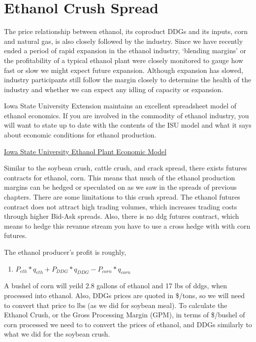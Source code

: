 \documentclass[
]{book}
\providecommand{\tightlist}{%
  \setlength{\itemsep}{0pt}\setlength{\parskip}{0pt}}
\begin{document}
\hypertarget{ethanol-crush-spread}{%
\section{Ethanol Crush Spread}\label{ethanol-crush-spread}}

The price relationship between ethanol, its coproduct DDGs and its inputs, corn and natural gas, is also closely followed by the industry. Since we have recently ended a period of rapid expansion in the ethanol industry, `blending margins' or the profitability of a typical ethanol plant were closely monitored to gauge how fast or slow we might expect future expansion. Although expansion has slowed, industry participants still follow the margin closely to determine the health of the industry and whether we can expect any idling of capacity or expansion.

Iowa State University Extension maintains an excellent spreadsheet model of ethanol economics. If you are involved in the commodity of ethanol industry, you will want to state up to date with the contents of the ISU model and what it says about economic conditions for ethanol production.

\href{https://www.extension.iastate.edu/agdm/articles/hof/HofJan08.html}{Iowa State University Ethanol Plant Economic Model}

Similar to the soybean crush, cattle crush, and crack spread, there exists futures contracts for ethanol, corn. This means that much of the ethanol production margins can be hedged or speculated on as we saw in the spreads of previous chapters. There are some limitations to this crush spread. The ethanol futures contract does not attract high trading volumes, which increases trading costs through higher Bid-Ask spreads. Also, there is no ddg futures contract, which means to hedge this revanue stream you have to use a cross hedge with with corn futures.

The ethanol producer's profit is roughly,

\begin{enumerate}
\def\labelenumi{\arabic{enumi}.}
\tightlist
\item
  \(P_{eth}*q_{eth} + P_{DDG}*q_{DDG} - P_{corn}*q_{corn}\)
\end{enumerate}

A bushel of corn will yeild 2.8 gallons of ethanol and 17 lbs of ddgs, when processed into ethanol. Also, DDGs prices are quoted in \$/tons, so we will need to convert that price to lbs (as we did for soybean meal). To calculate the Ethanol Crush, or the Gross Processing Margin (GPM), in terms of \$/bushel of corn processed we need to to convert the prices of ethanol, and DDGs similarly to what we did for the soybean crush.
\end{document}
